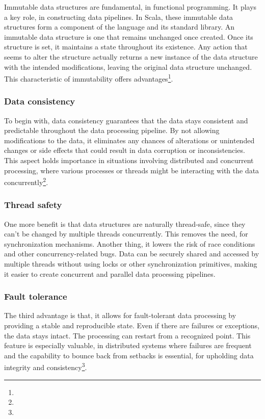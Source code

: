 Immutable data structures are fundamental, in functional programming. It plays a key role, in constructing data pipelines. In Scala, these immutable data structures form a component of the language and its standard library. An immutable data structure is one that remains unchanged once created. Once its structure is set, it maintains a state throughout its existence. Any action that seems to alter the structure actually returns a new instance of the data structure with the intended modifications, leaving the original data structure unchanged. This characteristic of immutability offers advantages\footnote[7]{}.

\subsubsection{Data consistency}

To begin with, data consistency guarantees that the data stays consistent and predictable throughout the data processing pipeline. By not allowing modifications to the data, it eliminates any chances of alterations or unintended changes or side effects that could result in data corruption or inconsistencies. This aspect holds importance in situations involving distributed and concurrent processing, where various processes or threads might be interacting with the data concurrently\footnote[8]{}.

\subsubsection{Thread safety}

One more benefit is that data structures are naturally thread-safe, since they can't be changed by multiple threads concurrently. This removes the need, for synchronization mechanisms. Another thing, it lowers the risk of race conditions and other concurrency-related bugs. Data can be securely shared and accessed by multiple threads without using locks or other synchronization primitives, making it easier to create concurrent and parallel data processing pipelines\footnotemark[8].

\subsubsection{Fault tolerance}

The third advantage is that, it allows for fault-tolerant data processing by providing a stable and reproducible state. Even if there are failures or exceptions, the data stays intact. The processing can restart from a recognized point. This feature is especially valuable, in distributed systems where failures are frequent and the capability to bounce back from setbacks is essential, for upholding data integrity and consistency\footnote[8]{}.

